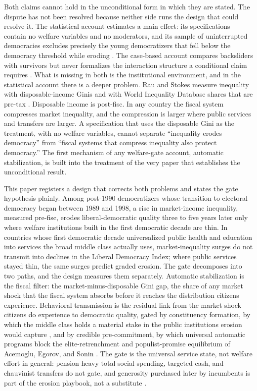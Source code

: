 \documentclass[11pt,letterpaper]{article}
\begin{document}
Both claims cannot hold in the unconditional form in which they are stated. The dispute has not been resolved because neither side runs the design that could resolve it. The statistical account estimates a main effect: its specifications contain no welfare variables and no moderators, and its sample of uninterrupted democracies excludes precisely the young democratizers that fell below the democracy threshold while eroding \citep{RauStokes2025}. The case-based account compares backsliders with survivors but never formalizes the interaction structure a conditional claim requires \citep{HaggardKaufman2021}. What is missing in both is the institutional environment, and in the statistical account there is a deeper problem. Rau and Stokes measure inequality with disposable-income Ginis and with World Inequality Database shares that are pre-tax \citep{RauStokes2025}. Disposable income is post-fisc. In any country the fiscal system compresses market inequality, and the compression is larger where public services and transfers are larger. A specification that uses the disposable Gini as the treatment, with no welfare variables, cannot separate ``inequality erodes democracy'' from ``fiscal systems that compress inequality also protect democracy.'' The first mechanism of any welfare-gate account, automatic stabilization, is built into the treatment of the very paper that establishes the unconditional result.

This paper registers a design that corrects both problems and states the gate hypothesis plainly. Among post-1990 democratizers whose transition to electoral democracy began between 1989 and 1998, a rise in market-income inequality, measured pre-fisc, erodes liberal-democratic quality three to five years later only where welfare institutions built in the first democratic decade are thin. In countries whose first democratic decade universalized public health and education into services the broad middle class actually uses, market-inequality surges do not transmit into declines in the Liberal Democracy Index; where public services stayed thin, the same surges predict graded erosion. The gate decomposes into two paths, and the design measures them separately. Automatic stabilization is the fiscal filter: the market-minus-disposable Gini gap, the share of any market shock that the fiscal system absorbs before it reaches the distribution citizens experience. Behavioral transmission is the residual link from the market shock citizens do experience to democratic quality, gated by constituency formation, by which the middle class holds a material stake in the public institutions erosion would capture \citep{Pierson1993, SossSchram2007, RothsteinUslaner2005}, and by credible pre-commitment, by which universal automatic programs block the elite-retrenchment and populist-promise equilibrium of Acemoglu, Egorov, and Sonin \citep{AcemogluEgorov2013}. The gate is the universal service state, not welfare effort in general: pension-heavy total social spending, targeted cash, and chauvinist transfers do not gate, and generosity purchased later by incumbents is part of the erosion playbook, not a substitute \citep{SzikraOktem2023, LendvaiBainton2021, Vanhuysse2006, Benczes2024, EnnserJedenastik2018}.
\end{document}
